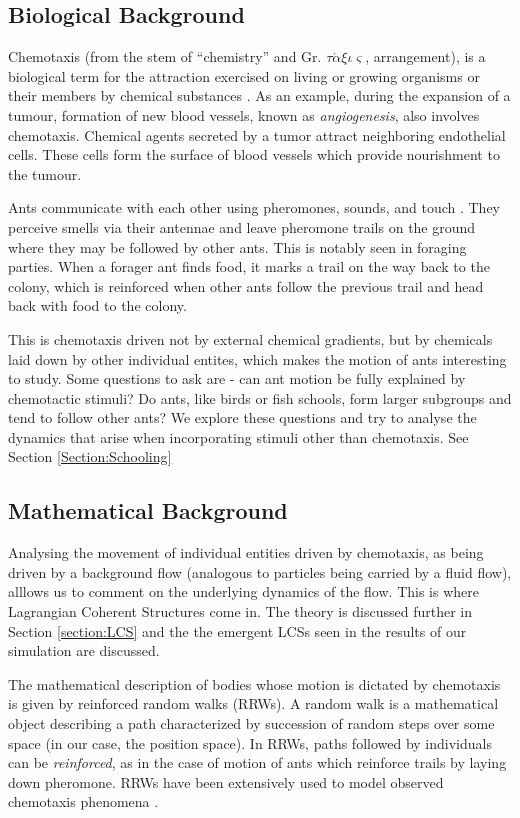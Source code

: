 \subsection{Biological Background}
Chemotaxis (from the stem of “chemistry” and Gr. $\tau\acute{\alpha}\xi\iota\varsigma$, arrangement), is a biological term for the attraction exercised on living or growing organisms or their members by chemical substances \cite{chemotaxisEncyclopedia}. As an example, during the expansion of a tumour, formation of new blood vessels, known as \textit{angiogenesis}, also involves chemotaxis. Chemical agents secreted by a tumor attract neighboring endothelial cells. These cells form the surface of blood vessels which provide nourishment to the tumour. \cite{MPlank:Angiogenesis}\cite{FriedmanTello2002}

Ants communicate with each other using pheromones, sounds, and touch \cite{Jackson2006}. They perceive smells via their antennae and leave pheromone trails on the ground where they may be followed by other ants. This is notably seen in foraging parties. When a forager ant finds food, it marks a trail on the way back to the colony, which is reinforced when other ants follow the previous trail and head back with food to the colony. \cite{Goss1989}

This is chemotaxis driven not by external chemical gradients, but by chemicals laid down by other individual entites, which makes the motion of ants interesting to study. Some questions to ask are - can ant motion be fully explained by chemotactic stimuli? Do ants, like birds or fish schools, form larger subgroups and tend to follow other ants? We explore these questions and try to analyse the dynamics that arise when incorporating stimuli other than chemotaxis. See Section \ref{Section:Schooling}

\subsection{Mathematical Background}
Analysing the movement of individual entities driven by chemotaxis, as being driven by a background flow (analogous to particles being carried by a fluid flow), alllows us to comment on the underlying dynamics of the flow. This is where Lagrangian Coherent Structures come in. The theory is discussed further in Section \ref{section:LCS} and the the emergent LCSs seen in the results of our simulation are discussed.

The mathematical description of bodies whose motion is dictated by chemotaxis is given by reinforced random walks (RRWs). A random walk is a mathematical object describing a path characterized by succession of random steps over some space (in our case, the position space). In RRWs, paths followed by individuals can be \textit{reinforced}, as in the case of motion of ants which reinforce trails by laying down pheromone. RRWs have been extensively used to model observed chemotaxis phenomena \cite{Codling2008}\cite{Pemantle2007}.

